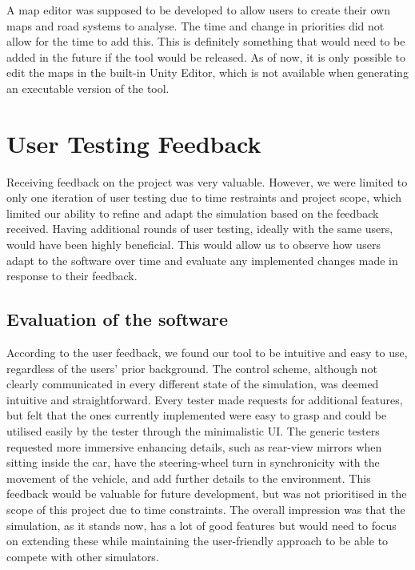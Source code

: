     A map editor was supposed to be developed to allow users to create their own maps and road systems to analyse. The time and change in priorities did not allow for the time to add this. This is definitely something that would need to be added in the future if the tool would be released. As of now, it is only possible to edit the maps in the built-in Unity Editor, which is not available when generating an executable version of the tool.

\section{User Testing Feedback}
    Receiving feedback on the project was very valuable. However, we were limited to only one iteration of user testing due to time restraints and project scope, which limited our ability to refine and adapt the simulation based on the feedback received. Having additional rounds of user testing, ideally with the same users, would have been highly beneficial. This would allow us to observe how users adapt to the software over time and evaluate any implemented changes made in response to their feedback.
    
    \subsection{Evaluation of the software}
        According to the user feedback, we found our tool to be intuitive and easy to use, regardless of the users' prior background. The control scheme, although not clearly communicated in every different state of the simulation, was deemed intuitive and straightforward.  Every tester made requests for additional features, but felt that the ones currently implemented were easy to grasp and could be utilised easily by the tester through the minimalistic UI. The generic testers requested more immersive enhancing details, such as rear-view mirrors when sitting inside the car, have the steering-wheel turn in synchronicity with the movement of the vehicle, and add further details to the environment. This feedback would be valuable for future development, but was not prioritised in the scope of this project due to time constraints. The overall impression was that the simulation, as it stands now, has a lot of good features but would need to focus on extending these while maintaining the user-friendly approach to be able to compete with other simulators.
    
